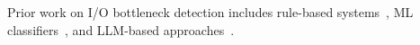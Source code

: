 

Prior work on I/O bottleneck detection includes rule-based
systems~\cite{bez2022drishti, devarajan2025wisio},
ML classifiers~\cite{dong2023aiio}, and LLM-based
approaches~\cite{egersdoerfer2025ioagent, egersdoerfer2024ion}.



